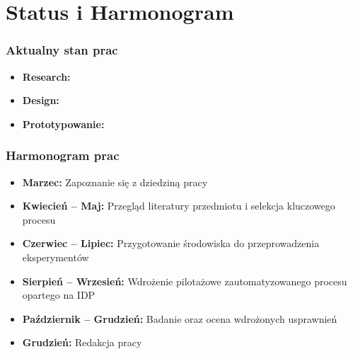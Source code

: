 \documentclass[11pt]{beamer}
\begin{document}
\section{Status i Harmonogram}

\begin{frame}
    \frametitle{Aktualny stan prac}
    \begin{itemize}
        \item \textbf{Research:} 
        \item \textbf{Design:} 
        \item \textbf{Prototypowanie:} 
    \end{itemize}
\end{frame}

\begin{frame}
    \frametitle{Harmonogram prac}
    \small 
    \begin{itemize}
        \setlength\itemsep{0.8em} 
        \item \textbf{Marzec:} Zapoznanie się z dziedziną pracy
        \item \textbf{Kwiecień -- Maj:} Przegląd literatury przedmiotu i selekcja kluczowego procesu
        \item \textbf{Czerwiec -- Lipiec:} Przygotowanie środowiska do przeprowadzenia eksperymentów
        \item \textbf{Sierpień -- Wrzesień:} Wdrożenie pilotażowe zautomatyzowanego procesu opartego na IDP
        \item \textbf{Październik -- Grudzień:} Badanie oraz ocena wdrożonych usprawnień
        \item \textbf{Grudzień:} Redakcja pracy
    \end{itemize}
\end{frame}


\end{document}
